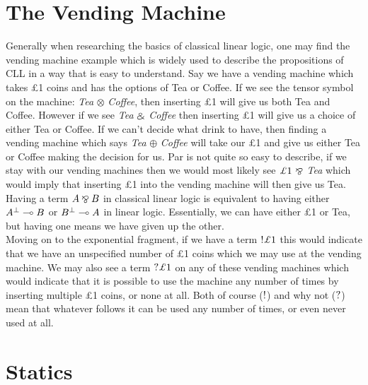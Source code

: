 \section{The Vending Machine}
\noindent
Generally when researching the basics of classical linear logic, one may find the vending machine example which is 
widely used to describe the propositions of CLL in a way that is easy to understand. Say we have a vending machine 
which takes \pounds 1 coins and has the options of Tea or Coffee. If we see the tensor symbol on the machine: \emph{Tea} 
$\otimes$ \emph{Coffee}, then inserting \pounds 1 will give us both Tea and Coffee. However if we see \emph{Tea} $\mathbin{\binampersand}$ 
\emph{Coffee} then inserting \pounds 1 will give us a choice of either Tea or Coffee. If we can't decide what drink to 
have, then finding a vending machine which says \emph{Tea} $\oplus$ \emph{Coffee} will take our \pounds 1 and give us either 
Tea or Coffee making the decision for us. Par is not quite so easy to describe, if we stay with our vending machines then 
we would most likely see $\pounds 1 \ \parr$ \emph{Tea} which would imply that inserting \pounds 1 into the vending machine 
will then give us Tea. Having a term $A \mathbin{\bindnasrepma} B$ in classical linear logic is equivalent to having either $\negg{A} \multimap B$ 
or $\negg{B} \multimap A$ in linear logic. Essentially, we can have either \pounds 1 or Tea, but having one means we 
have given up the other.  \\

\noindent
Moving on to the exponential fragment, if we have a term $\ofc \pounds 1$ this would indicate that we have an unspecified 
number of \pounds 1 coins which we may use at the vending machine. We may also see a term $\whynot \pounds 1$ on any of 
these vending machines which would indicate that it is possible to use the machine any number of times by inserting multiple 
\pounds 1 coins, or none at all. Both of course ($\textrm{!}$) and why not ($\textrm{?}$) mean that whatever follows it can be used any 
number of times, or even never used at all. \\

\section{Statics}

